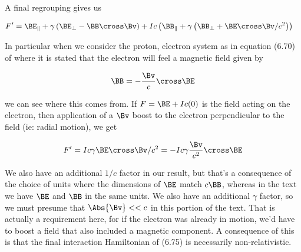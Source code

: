 A final regrouping gives us

\begin{align}\label{eqn:boostCommutator:50}
F'
&=
\BE_\parallel + \gamma \left( \BE_\perp - \BB \cross \Bv \right)
+I c \left( \BB_\parallel + \gamma \left( \BB_\perp + \BE \cross \Bv/c^2 \right) \right)
\end{align}

In particular when we consider the proton, electron system as in equation (6.70) of \cite{desai2009quantum} where it is stated that the electron will feel a magnetic field given by

\begin{align}\label{eqn:boostCommutator:51}
\BB = - \frac{\Bv}{c} \cross \BE
\end{align}

we can see where this comes from.  If $F = \BE + I c (0)$ is the field acting on the electron, then application of a $\Bv$ boost to the electron perpendicular to the field (ie: radial motion), we get

\begin{align}\label{eqn:boostCommutator:52}
F' = I c \gamma \BE \cross \Bv/c^2 =
-I c \gamma \frac{\Bv}{c^2} \cross \BE
\end{align}

We also have an additional $1/c$ factor in our result, but that's a consequence of the choice of units where the dimensions of $\BE$ match $c \BB$, whereas in the text we have $\BE$ and $\BB$ in the same units.  We also have an additional $\gamma$ factor, so we must presume that $\Abs{\Bv} << c$ in this portion of the text.  That is actually a requirement here, for if the electron was already in motion, we'd have to boost a field that also included a magnetic component.  A consequence of this is that the final interaction Hamiltonian of (6.75) is necessarily non-relativistic.

\EndArticle
